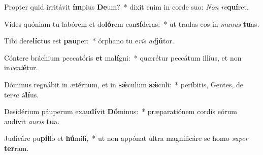 \item Propter quid irritávit \textbf{ím}pius \textbf{De}um?~* dixit enim in corde suo: \textit{Non} \textit{re}\textbf{quí}ret.
\item Vides quóniam tu labórem et do\textbf{ló}rem con\textbf{sí}deras:~* ut tradas eos in \textit{ma}\textit{nus} \textbf{tu}as.
\item Tibi dere\textbf{líc}tus est \textbf{pau}per:~* órphano tu e\textit{ris} \textit{ad}\textbf{jú}tor.
\item Cóntere bráchium peccatóris \textbf{et} ma\textbf{lí}gni:~* quærétur peccátum illíus, et non in\textit{ve}\textit{ni}\textbf{é}tur.
\item Dóminus regnábit in ætérnum, et in \textbf{sǽ}culum \textbf{sǽ}culi:~* períbitis, Gentes, de ter\textit{ra} \textit{il}\textbf{lí}us.
\item Desidérium páuperum exau\textbf{dí}vit \textbf{Dó}minus:~* præparatiónem cordis eórum audívit \textit{au}\textit{ris} \textbf{tu}a.
\item Judicáre pu\textbf{píl}lo et \textbf{hú}mili,~* ut non appónat ultra magnificáre se homo \textit{su}\textit{per} \textbf{ter}ram.
